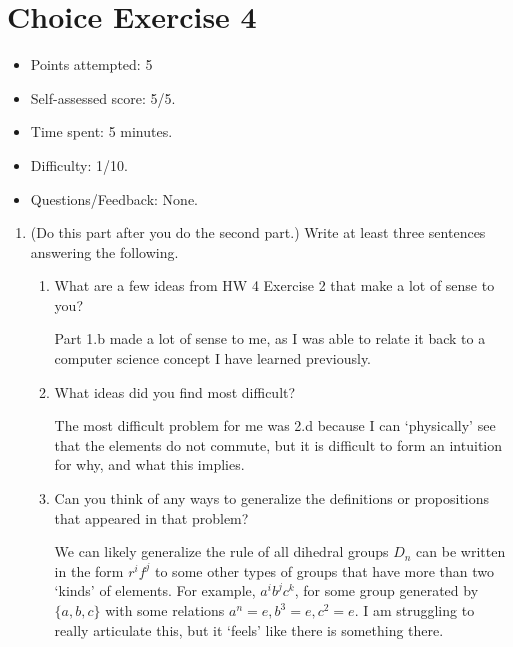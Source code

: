 \documentclass{article}
\begin{document}
\section*{Choice Exercise 4}
\begin{itemize}
  \item Points attempted: 5
  \item Self-assessed score: 5/5.
  \item Time spent: 5 minutes.
  \item Difficulty: 1/10.
  \item Questions/Feedback: None.
\end{itemize}
\begin{enumerate}
    \item {
        (Do this part after you do the second part.) Write at least three sentences answering the following.

        \begin{enumerate}
            \item {
                What are a few ideas from HW 4 Exercise 2 that make a lot of sense to you?

                Part 1.b made a lot of sense to me, as I was able to relate it 
                back to a computer science concept I have learned previously.
            }

            \item {
                What ideas did you find most difficult?
        
                The most difficult problem for me was 2.d because I can `physically'
                see that the elements do not commute, but it is difficult to 
                form an intuition for why, and what this implies.
            }

            \item {
                Can you think of any ways to generalize the definitions or propositions that appeared in that problem?

                We can likely generalize the rule of all dihedral groups \(D_n\) 
                can be written in the form \(r^i f^j\) to some other types of 
                groups that have more than two `kinds' of elements. For example,
                \(a^i b^j c^k\), for some group generated by \(\{a,b,c\}\) with
                some relations \(a^n = e, b^3 = e, c^2 = e\). I am struggling 
                to really articulate this, but it `feels' like there is something
                there.
            }
        \end{enumerate}
    }


\end{enumerate}
\end{document}
